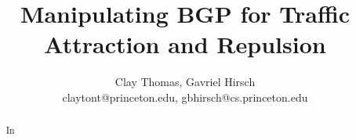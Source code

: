 \documentclass[12pt]{article}
\begin{document}
 
\title{Manipulating BGP for Traffic Attraction and Repulsion}
\author{Clay Thomas, Gavriel Hirsch\\
claytont@princeton.edu, gbhirsch@cs.princeton.edu }
\maketitle

\begin{abstract}
  In 
\end{abstract}
\end{document}
